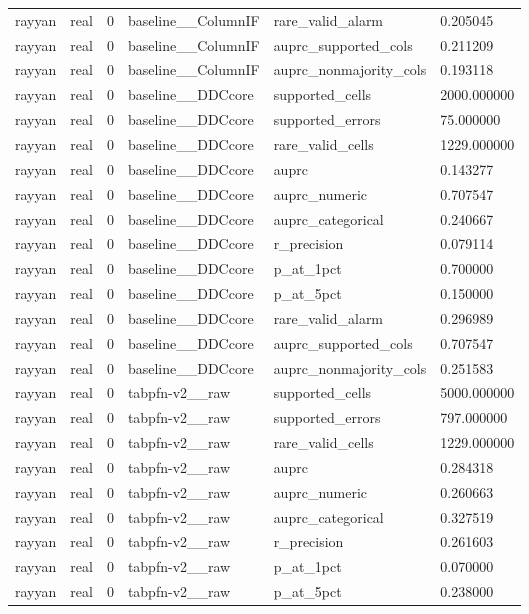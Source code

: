 \begin{tabular}{llllll}
rayyan & real & 0 & baseline\_\_ColumnIF & rare\_valid\_alarm & 0.205045 \\
rayyan & real & 0 & baseline\_\_ColumnIF & auprc\_supported\_cols & 0.211209 \\
rayyan & real & 0 & baseline\_\_ColumnIF & auprc\_nonmajority\_cols & 0.193118 \\
rayyan & real & 0 & baseline\_\_DDCcore & supported\_cells & 2000.000000 \\
rayyan & real & 0 & baseline\_\_DDCcore & supported\_errors & 75.000000 \\
rayyan & real & 0 & baseline\_\_DDCcore & rare\_valid\_cells & 1229.000000 \\
rayyan & real & 0 & baseline\_\_DDCcore & auprc & 0.143277 \\
rayyan & real & 0 & baseline\_\_DDCcore & auprc\_numeric & 0.707547 \\
rayyan & real & 0 & baseline\_\_DDCcore & auprc\_categorical & 0.240667 \\
rayyan & real & 0 & baseline\_\_DDCcore & r\_precision & 0.079114 \\
rayyan & real & 0 & baseline\_\_DDCcore & p\_at\_1pct & 0.700000 \\
rayyan & real & 0 & baseline\_\_DDCcore & p\_at\_5pct & 0.150000 \\
rayyan & real & 0 & baseline\_\_DDCcore & rare\_valid\_alarm & 0.296989 \\
rayyan & real & 0 & baseline\_\_DDCcore & auprc\_supported\_cols & 0.707547 \\
rayyan & real & 0 & baseline\_\_DDCcore & auprc\_nonmajority\_cols & 0.251583 \\
rayyan & real & 0 & tabpfn-v2\_\_raw & supported\_cells & 5000.000000 \\
rayyan & real & 0 & tabpfn-v2\_\_raw & supported\_errors & 797.000000 \\
rayyan & real & 0 & tabpfn-v2\_\_raw & rare\_valid\_cells & 1229.000000 \\
rayyan & real & 0 & tabpfn-v2\_\_raw & auprc & 0.284318 \\
rayyan & real & 0 & tabpfn-v2\_\_raw & auprc\_numeric & 0.260663 \\
rayyan & real & 0 & tabpfn-v2\_\_raw & auprc\_categorical & 0.327519 \\
rayyan & real & 0 & tabpfn-v2\_\_raw & r\_precision & 0.261603 \\
rayyan & real & 0 & tabpfn-v2\_\_raw & p\_at\_1pct & 0.070000 \\
rayyan & real & 0 & tabpfn-v2\_\_raw & p\_at\_5pct & 0.238000 \\

\end{tabular}
